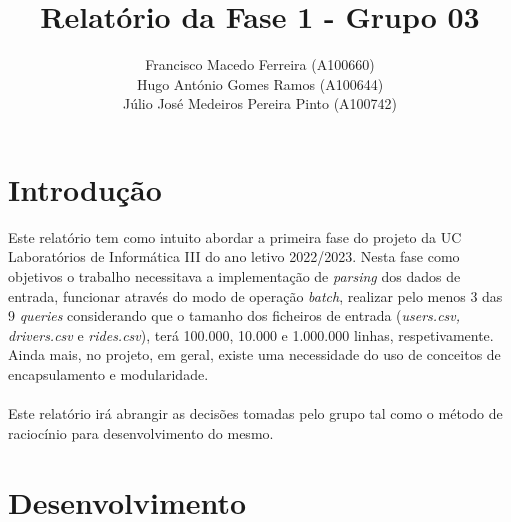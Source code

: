 \documentclass{article}
\title{Relatório da Fase 1 - Grupo 03}
\author{Francisco Macedo Ferreira (A100660)\\Hugo António Gomes Ramos (A100644)\\Júlio José Medeiros Pereira Pinto (A100742)}
\begin{document}
    \maketitle

    \section{Introdução}

    Este relatório tem como intuito abordar a primeira fase do projeto da UC Laboratórios 
    de Informática III do ano letivo 2022/2023.
    Nesta fase como objetivos o trabalho necessitava a implementação de \emph{parsing} dos
    dados de entrada, funcionar através do modo de operação \emph{batch}, 
    realizar pelo menos 3 das 9 \emph{queries} considerando que o 
    tamanho dos ficheiros de entrada 
    (\emph{users.csv, drivers.csv} e \emph{rides.csv}), terá 100.000, 10.000 e 
    1.000.000 linhas, respetivamente. Ainda mais, no projeto, em geral, existe 
    uma necessidade do uso de conceitos de encapsulamento e modularidade.
    \\
    \\Este relatório irá abrangir as decisões tomadas pelo grupo tal como o método de raciocínio para desenvolvimento do mesmo.
    

    \section{Desenvolvimento}
\end{document}
